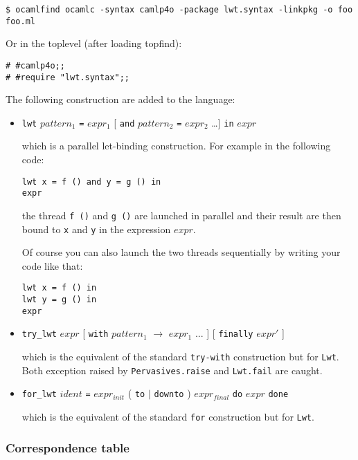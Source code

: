 \documentclass{article}
\newcommand{\lwt}{\texttt{Lwt}\xspace}
\begin{document}
\begin{verbatim}
$ ocamlfind ocamlc -syntax camlp4o -package lwt.syntax -linkpkg -o foo foo.ml
\end{verbatim}

Or in the toplevel (after loading topfind):

\begin{verbatim}
# #camlp4o;;
# #require "lwt.syntax";;
\end{verbatim}

The following construction are added to the language:

\begin{itemize}
\item \texttt{lwt} $pattern_1$ \texttt{=} $expr_1$ [ \texttt{and}
  $pattern_2$ \texttt{=} $expr_2$ \dots ] \texttt{in} $expr$

  which is a parallel let-binding construction. For example in the
  following code:

\begin{verbatim}
lwt x = f () and y = g () in
expr
\end{verbatim}

  the thread \texttt{f ()} and \texttt{g ()} are launched in parallel
  and their result are then bound to \texttt{x} and \texttt{y} in the
  expression $expr$.

  Of course you can also launch the two threads sequentially by
  writing your code like that:

\begin{verbatim}
lwt x = f () in
lwt y = g () in
expr
\end{verbatim}

\item \texttt{try\_lwt} $expr$ [ \texttt{with} $pattern_1$
  \texttt{$\rightarrow$} $expr_1$ ... ] [ \texttt{finally} $expr'$ ]

  which is the equivalent of the standard \texttt{try-with}
  construction but for \lwt. Both exception raised by
  \texttt{Pervasives.raise} and \texttt{Lwt.fail} are caught.

\item \texttt{for\_lwt} $ident$ \texttt{=} $expr_{init}$ ( \texttt{to}
  $\mid$ \texttt{downto} ) $expr_{final}$ \texttt{do} $expr$
  \texttt{done}

  which is the equivalent of the standard \texttt{for} construction
  but for \lwt.
\end{itemize}

\subsubsection{Correspondence table}
\end{document}

